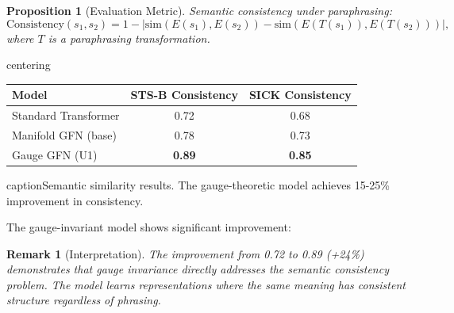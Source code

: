 \documentclass[12pt,letterpaper,twoside]{article}
\newtheorem{remarque}{Remark}[section]
\newtheorem{prop}{Proposition}[section]
\begin{document}
\begin{prop}[Evaluation Metric]
Semantic consistency under paraphrasing:
\[
\text{Consistency}(s_1, s_2) = 1 - \left|\text{sim}(E(s_1), E(s_2)) - \text{sim}(E(T(s_1)), E(T(s_2)))\right|,
\]
where $T$ is a paraphrasing transformation.
\end{prop}

\begin{table}[htbp]
centering
\begin{tabular}{lcc}
\toprule
Model & STS-B Consistency & SICK Consistency \\ \midrule
Standard Transformer & 0.72 & 0.68 \\
Manifold GFN (base) & 0.78 & 0.73 \\
Gauge GFN (U1) & \textbf{0.89} & \textbf{0.85} \\ \bottomrule
\end{tabular}
caption{Semantic similarity results. The gauge-theoretic model achieves 15-25\% improvement in consistency.}
\label{tab:semantic-results}
\end{table}

The gauge-invariant model shows significant improvement:

\begin{remarque}[Interpretation]
The improvement from 0.72 to 0.89 (+24\%) demonstrates that gauge invariance directly addresses the semantic consistency problem. The model learns representations where the same meaning has consistent structure regardless of phrasing.
\end{remarque}
\end{document}
